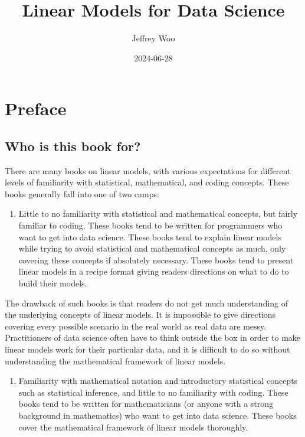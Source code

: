 \documentclass[
]{book}
\title{Linear Models for Data Science}
\author{Jeffrey Woo}
\date{2024-06-28}
\providecommand{\tightlist}{%
  \setlength{\itemsep}{0pt}\setlength{\parskip}{0pt}}
\begin{document}
\maketitle

{
\setcounter{tocdepth}{1}
\tableofcontents
}
\hypertarget{preface}{%
\chapter*{Preface}\label{preface}}

\hypertarget{who-is-this-book-for}{%
\section*{Who is this book for?}\label{who-is-this-book-for}}

There are many books on linear models, with various expectations for different levels of familiarity with statistical, mathematical, and coding concepts. These books generally fall into one of two camps:

\begin{enumerate}
\def\labelenumi{\arabic{enumi}.}
\tightlist
\item
  Little to no familiarity with statistical and mathematical concepts, but fairly familiar to coding. These books tend to be written for programmers who want to get into data science. These books tend to explain linear models while trying to avoid statistical and mathematical concepts as much, only covering these concepts if absolutely necessary. These books tend to present linear models in a recipe format giving readers directions on what to do to build their models.
\end{enumerate}

The drawback of such books is that readers do not get much understanding of the underlying concepts of linear models. It is impossible to give directions covering every possible scenario in the real world as real data are messy. Practitioners of data science often have to think outside the box in order to make linear models work for their particular data, and it is difficult to do so without understanding the mathematical framework of linear models.

\begin{enumerate}
\def\labelenumi{\arabic{enumi}.}
\setcounter{enumi}{1}
\tightlist
\item
  Familiarity with mathematical notation and introductory statistical concepts such as statistical inference, and little to no familiarity with coding. These books tend to be written for mathematicians (or anyone with a strong background in mathematics) who want to get into data science. These books cover the mathematical framework of linear models thoroughly.
\end{enumerate}
\end{document}
